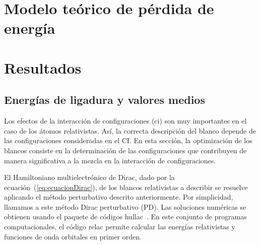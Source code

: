 \section{Modelo teórico de pérdida de energía}
\label{sec:method-stopping}




\section{Resultados}
\label{sec:results-heavy}


\subsection{Energías de ligadura y valores medios}
\label{subsec:results-target}

Los efectos de la interacción de configuraciones (\acs{ci}) son muy 
importantes en el caso de los átomos relativistas. Así, la correcta 
descripción del blanco depende de las configuraciones consideradas en 
el CI. En esta sección, la optimización de los blancos consiste en la 
determinación de las configuraciones que contribuyen de manera 
significativa a la mezcla en la interacción de configuraciones. 

El Hamiltoniano multielectrónico de Dirac, dado por la 
ecuación~(\ref{eq:ecuacionDirac}), de los blancos relativistas a 
describir se resuelve aplicando el método perturbativo descrito 
anteriormente. Por simplicidad, llamamos a este método Dirac 
perturbativo (PD). Las soluciones numéricas se obtienen usando el 
paquete de códigos {\sc hullac}~\cite{BarShalom:01}. En este conjunto 
de programas computacionales, el código {\sc relac} permite calcular 
las energías relativistas y funciones de onda orbitales en primer orden. 

